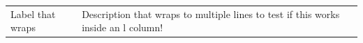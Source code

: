 ﻿\documentclass[10pt]{article}
\begin{document}
\begin{tabular}{|l|l|}
\hline
\rowcolor{navy}\multicolumn{2}{|l|}{\color{white} Header} \\
\hline
\begin{minipage}[t]{3cm} Label that wraps \end{minipage} &
\begin{minipage}[t]{6cm} Description that wraps to multiple lines to test if this works inside an l column! \end{minipage} \\
\hline
\end{tabular}
\end{document}
